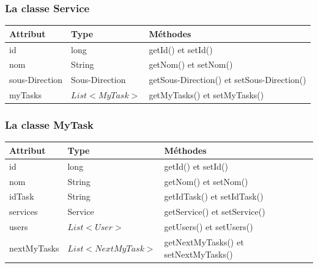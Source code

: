 \subsubsection*{La classe Service}
\begin{table}[H]
	\centering
	\begin{tabular}{|l|l|l|}
		\hline
		\textbf{Attribut}  & \textbf{Type} & \multicolumn{1}{l|}{\textbf{Méthodes}} \\ \hline
		
		id & long & getId() et setId()\\ \cline{1-2}
		nom & String  & getNom() et setNom() \\ \cline{1-2}
				sous-Direction & Sous-Direction  & getSous-Direction() et setSous-Direction() \\ \cline{1-2}
		myTasks	& $ List<MyTask> $ & getMyTasks() et setMyTasks()   \\ \hline
	\end{tabular}
\end{table}


\subsubsection*{La classe MyTask}
\begin{table}[H]
	\centering
	\begin{tabular}{|l|l|l|}
		\hline
		\textbf{Attribut}  & \textbf{Type} & \multicolumn{1}{l|}{\textbf{Méthodes}} \\ \hline
		
		id & long & getId() et setId()\\ \cline{1-2}
		nom & String  & getNom() et setNom() \\ \cline{1-2}
			idTask & String & getIdTask() et setIdTask()\\ \cline{1-2}
		services & Service  & getService() et setService() \\ \cline{1-2}
				users	& $ List<User> $ & getUsers() et setUsers()   \\ \cline{1-2}	
				
		nextMyTasks	& $ List<NextMyTask> $ & getNextMyTasks() et setNextMyTasks()   \\ \hline
	\end{tabular}
\end{table}

